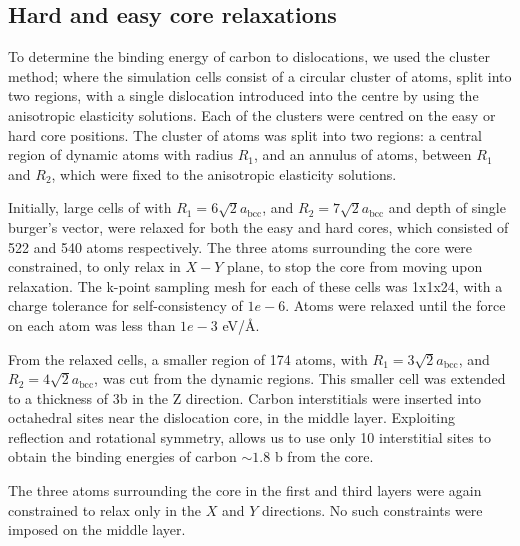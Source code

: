\documentclass[a4paper]{article}
\begin{document}
\subsection{Hard and easy core relaxations}
\label{sec:orgf365e73}

To determine the binding energy of carbon to dislocations, we used the
cluster method; where the simulation cells consist of a circular cluster of
atoms, split into two regions, with a single dislocation introduced into the
centre by using the anisotropic elasticity solutions. Each of the clusters
were centred on the easy or hard core positions. The cluster of atoms was
split into two regions: a central region of dynamic atoms with radius \(R_1\),
and an annulus of atoms, between \(R_1\) and \(R_2\), which were fixed to the anisotropic
elasticity solutions. 

Initially, large cells of with \(R_1 = 6\sqrt{2}a_{\text{bcc}}\), and \(R_2 =
   7\sqrt{2}a_{\text{bcc}}\) and depth of single burger's vector, were relaxed
for both the easy and hard cores, which consisted of 522 and 540 atoms
respectively. The three atoms surrounding the core were constrained, to only
relax in \(X-Y\) plane, to stop the core from moving upon relaxation. The
k-point sampling mesh for each of these cells was 1x1x24, with a charge
tolerance for self-consistency of \(1e-6\). Atoms were relaxed until the force
on each atom was less than \(1e-3\) eV/\AA{}.  

From the relaxed cells, a smaller region of 174 atoms, with \(R_1 =
   3\sqrt{2}a_{\text{bcc}}\), and \(R_2 = 4\sqrt{2}a_{\text{bcc}}\), was cut from
the dynamic regions. This smaller cell was extended to a thickness of 3b in
the Z direction. Carbon interstitials were inserted into octahedral sites
near the dislocation core, in the middle layer. Exploiting reflection and
rotational symmetry, allows us to use only 10 interstitial
sites to obtain the binding energies of carbon \(\sim 1.8\) b from the core. 

The three atoms surrounding the core in the first and third layers were again
constrained to relax only in the \(X\) and \(Y\) directions. No such constraints
were imposed on the middle layer. 
\end{document}
